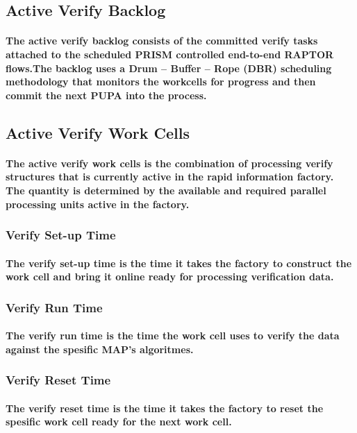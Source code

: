 \documentclass{acm_proc_article-sp}
\begin{document}
\subsection{Active Verify Backlog}
\paragraph{The active verify backlog consists of the committed verify tasks attached to the scheduled PRISM controlled end-to-end RAPTOR flows.The backlog uses a Drum – Buffer – Rope (DBR) scheduling methodology \cite{daniel1997scheduling} that monitors the workcells for progress and then commit the next PUPA into the process.}
\subsection{Active Verify Work Cells}
\paragraph{The active verify work cells is the combination of processing verify structures that is currently active in the rapid information factory. The quantity is determined by the available and required parallel processing units active in the factory.}
\subsubsection{Verify Set-up Time}
\paragraph{The verify set-up time is the time it takes the factory to construct the work cell and bring it online ready for processing verification data.}
\subsubsection{Verify Run Time}
\paragraph{The verify run time is the time the work cell uses to verify the data against the spesific MAP's algoritmes.}
\subsubsection{Verify Reset Time}
\paragraph{The verify reset time is the time it takes the factory to reset the spesific work cell ready for the next work cell.}
\end{document}
